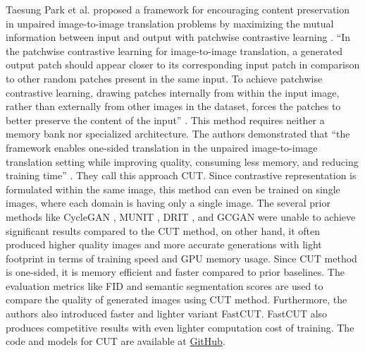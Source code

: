 Taesung Park et al.\cite{park2020contrastive} proposed a framework for encouraging content preservation in unpaired image-to-image translation problems by maximizing the mutual information between input and output with patchwise contrastive learning \cite{oord2019representation}. ``In the patchwise contrastive learning for image-to-image translation, a generated output patch should appear closer to its corresponding input patch in comparison to other random patches present in the same input. To achieve patchwise contrastive learning, drawing patches internally from within the input image, rather than externally from other images in the dataset, forces the patches to better preserve the content of the input'' \cite{park2020contrastive}. This method requires neither a memory bank nor specialized architecture. The authors demonstrated that ``the framework enables one-sided translation in the unpaired image-to-image translation setting while improving quality, consuming less memory, and reducing training time'' \cite{park2020contrastive}. They call this approach \ac{CUT}. Since contrastive representation is formulated within the same image, this method can even be trained on single images, where each domain is having only a single image. The several prior methods like \ac{CycleGAN} \cite{zhu2020unpaired}, \ac{MUNIT} \cite{liu2018unsupervised}, \ac{DRIT} \cite{lee2019drit}, and \ac{GCGAN} \cite{fu2018geometryconsistent} were unable to achieve significant results compared to the \ac{CUT} method, on other hand, it often produced higher quality images and more accurate generations with light footprint in terms of training speed and GPU memory usage. Since \ac{CUT} method is one-sided, it is memory efficient and faster compared to prior baselines. The evaluation metrics like \ac{FID} \cite{heusel2018gans} and semantic segmentation scores are used to compare the quality of generated images using \ac{CUT} method. Furthermore, the authors also introduced faster and lighter variant \ac{FastCUT}. \ac{FastCUT} also produces competitive results with even lighter computation cost of training. The code and models for \ac{CUT} are available at \href{https://github.com/taesungp/contrastive-unpaired-translation}{GitHub}.


